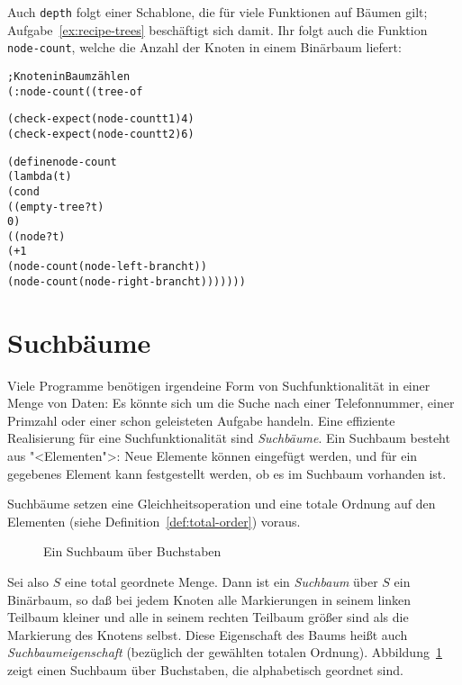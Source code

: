 Auch \texttt{depth} folgt einer 
Schablone, die für viele Funktionen auf Bäumen
gilt; Aufgabe~\ref{ex:recipe-trees} beschäftigt sich damit.
Ihr folgt auch die Funktion \texttt{node-count}, welche die Anzahl der
Knoten in einem Binärbaum liefert:
%
\begin{alltt}
; Knoten in Baum zählen
(: node-count ((tree-of %a) -> natural))

(check-expect (node-count t1) 4)
(check-expect (node-count t2) 6)

(define node-count
  (lambda (t)
    (cond
      ((empty-tree? t)
       0)
      ((node? t)
       (+ 1
          (node-count (node-left-branch t))
          (node-count (node-right-branch t)))))))
\end{alltt}
%

\section{Suchbäume}
\label{sec:search-trees}

Viele Programme benötigen irgendeine Form von Suchfunktionalität in
einer Menge von Daten: Es könnte sich um die Suche nach einer
Telefonnummer, einer Primzahl oder einer schon geleisteten Aufgabe
handeln.  Eine effiziente Realisierung für eine Suchfunktionalität
sind \textit{Suchbäume}.  Ein Suchbaum besteht aus
"<Elementen">: Neue Elemente können eingefügt werden, und für ein
gegebenes Element kann festgestellt werden, ob es im Suchbaum
vorhanden ist.

Suchbäume setzen eine Gleichheitsoperation und eine totale Ordnung auf
den Elementen (siehe Definition~\ref{def:total-order}) voraus.

\begin{figure}[tb]
\begin{pspdf}
\begin{center}
   {
     {  }
     {   } }
\end{center}
\end{pspdf}
  \caption{Ein Suchbaum über Buchstaben}
  \label{fig:searchtree}
\end{figure}

 Sei also $S$ eine total geordnete
Menge.  Dann ist ein \textit{Suchbaum} über $S$ ein Binärbaum, so daß bei
jedem Knoten alle Markierungen in seinem linken Teilbaum kleiner und
alle in seinem rechten Teilbaum größer sind als die Markierung des Knotens
selbst.  Diese Eigenschaft des Baums heißt auch
\textit{Suchbaumeigenschaft} (bezüglich der gewählten totalen
Ordnung).
Abbildung~\ref{fig:searchtree} zeigt einen Suchbaum über Buchstaben,
die alphabetisch geordnet sind.

